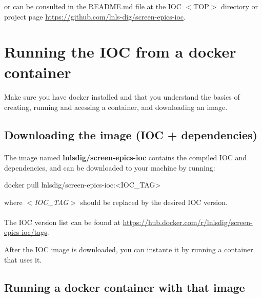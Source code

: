\documentclass[openany]{article}
\begin{document}
    or can be consulted in the README.md file at the IOC $<$TOP$>$ directory or project page \url{https://github.com/lnls-dig/screen-epics-ioc}.

\section{Running the IOC from a docker container}\label{sec:run-with-docker}

    \paragraph{} Make sure you have docker installed and that you understand the basics of creating, running and acessing a container, and downloading an image.

    \subsection{Downloading the image (IOC + dependencies)}

        \paragraph{} The image named \textbf{lnlsdig/screen-epics-ioc} contains the compiled IOC and dependencies, and can be downloaded to your machine by running:

        \vspace{1mm}
        \begin{code}
docker pull lnlsdig/screen-epics-ioc:<IOC_TAG>
        \end{code}
        \vspace{1mm}

        where \emph{$<$IOC\_TAG$>$} should be replaced by the desired IOC version.

        \paragraph{} The IOC version list can be found at \url{https://hub.docker.com/r/lnlsdig/screen-epics-ioc/tags}.

        After the IOC image is downloaded, you can instante it by running a container that uses it.

    \subsection{Running a docker container with that image}
\end{document}
